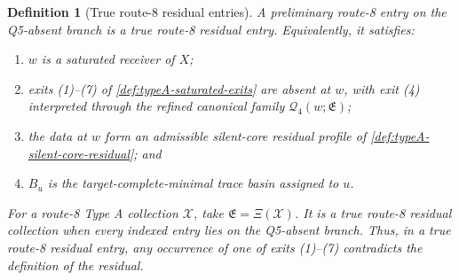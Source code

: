 \documentclass[11pt]{article}
\newtheorem{definition}[theorem]{Definition}
\begin{document}
\begin{definition}[True route-8 residual entries]
A preliminary route-8 entry on the Q5-absent branch is a \emph{true route-8
residual entry}.  Equivalently, it satisfies:
\begin{enumerate}[label=(R\arabic*), leftmargin=2.2em]
\item \(w\) is a saturated receiver of \(X\);
\item exits (1)--(7) of \cref{def:typeA-saturated-exits} are absent at \(w\),
with exit (4) interpreted through the refined canonical family
\(\mathcal Q_4(w;\mathfrak E)\);
\item the data at \(w\) form an admissible silent-core residual profile of
\cref{def:typeA-silent-core-residual}; and
\item \(B_u\) is the target-complete-minimal trace basin assigned to \(u\).
\end{enumerate}
For a route-8 Type A collection \(\mathcal X\), take
\(\mathfrak E=\Xi(\mathcal X)\).  It is a \emph{true route-8 residual
collection} when every indexed entry lies on the Q5-absent branch.  Thus, in a
true route-8 residual entry, any occurrence of one of exits (1)--(7)
contradicts the definition of the residual.
\end{definition}
\end{document}

